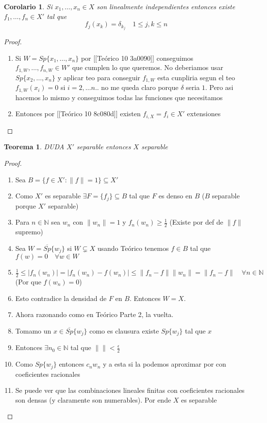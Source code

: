 \documentclass[10pt]{extarticle}
\theoremstyle{break}
\newtheorem{theorem}{Teorema}[section]
\newtheorem{corollary}{Corolario}[theorem]
\theoremstyle{definition}
\begin{document}
\begin{corollary}
Si $x_{1},\ldots,x_{n} \in X$ son linealmente independientes entonces existe $f_{1},\ldots,f_{n}\in X'$ tal que $$f_{j}(x_{k})=\delta_{k_{j}} \quad 1\leq j,k\leq n$$
\end{corollary}

\begin{proof}
	\begin{enumerate}
		\item Si $W=Sp\{ x_{1},\ldots,x_{n} \}$ por [[Teórico 10 3a0090]] conseguimos $f_{1,W},\ldots,f_{n,W}\in W'$ que cumplen lo que queremos. No deberiamos usar $Sp\{ x_{2},\ldots,x_{n} \}$ y aplicar teo para conseguir $f_{1,W}$ esta cunpliria segun el teo $f_{1,W}(x_{i})=0$ si $i=2,\ldots n$.. no me queda claro porque $\delta$ seria $1$. Pero asi hacemos lo mismo y conseguimos todas las funciones que necesitamos
		\item Entonces por [[Teórico 10 8c080d]] existen $f_{i,X} = f_{i}\in X'$ extensiones
	\end{enumerate}
\end{proof}

\begin{theorem} DUDA
$X'$ separable entonces $X$ separable
\end{theorem}

\begin{proof}
	\begin{enumerate}
		\item Sea $B=\{ f\in X':\lVert f \rVert=1 \}\subseteq X'$
		\item Como $X'$ es separable $\exists F=\{ f_{j} \}\subseteq B$ tal que $F$ es denso en $B$ ($B$ separable porque $X'$ separable)
		\item Para $n\in \mathbb{N}$ sea $w_{n}$ con $\lVert w_{n} \rVert=1$ y $f_{n}(w_{n})\geq \frac{1}{2}$ (Existe por def de $\lVert f \rVert$ supremo)
		\item Sea $W=\overline{Sp}\{ w_{j} \}$ si $W\subsetneq X$ usando Teórico tenemos $f\in B$ tal que $f(w)=0\quad\forall w\in W$
		\item $\frac{1}{2}\leq \lvert f_{n}(w_{n}) \rvert=\lvert f_{n}(w_{n})-f(w_{n}) \rvert\leq \lVert f_{n}-f \rVert\lVert w_{n} \rVert=\lVert f_{n}-f \rVert\quad\forall n\in \mathbb{N}$ (Por que $f(w_{n})=0$)
		\item Esto contradice la densidad de $F$ en $B$. Entonces $W=X$.
		\item Ahora razonando como en Teórico Parte 2, la vuelta.
		\item Tomamo un $x\in \overline{Sp}\{ w_{j} \}$ como es clausura existe $Sp\{ w_{j} \}$ tal que $x$
		\item Entonces $\exists n_{0}\in \mathbb{N}$ tal que $\lVert \rVert<\frac{\epsilon}{2}$
		\item Como $Sp\{ w_{j} \}$ entonces $c_{n}w_{n}$ y a esta si la podemos aproximar por con coeficientes racionales
		\item Se puede ver que las combinaciones lineales finitas con coeficientes racionales son densas (y claramente son numerables). 
			Por ende $X$ es separable
	\end{enumerate}
\end{proof}
\end{document}
